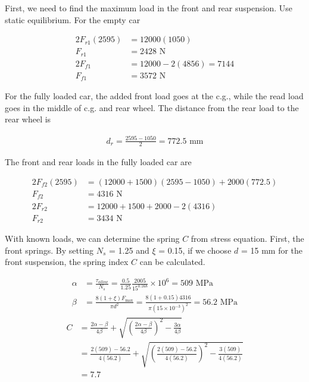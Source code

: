 \documentclass[a4paper,openany,12pt]{book}
\begin{document}
{{First, we need to find the maximum load in the front and rear
suspension. Use static equilibrium. For the empty car

$$\begin{aligned}
     2F_{r1}(2595) &= 12000(1050) \\
     F_{r1} &= 2428 \text{ N} \\
     2F_{f1} &= 12000 - 2(4856) = 7144 \\
     F_{f1} &= 3572 \text{ N}
   \end{aligned}$$

For the fully loaded car, the added front load goes at the c.g., while
the read load goes in the middle of c.g. and rear wheel. The distance
from the rear load to the rear wheel is

$$\begin{gathered}
     d_r = \frac{2595 - 1050}{2} = 772.5 \text{ mm}
   \end{gathered}$$

The front and rear loads in the fully loaded car are

$$\begin{aligned}
     2F_{f2}(2595) &= (12000 + 1500)(2595 - 1050) + 2000(772.5) \\
     F_{f2} &= 4316 \text{ N} \\
     2F_{r2} &= 12000 + 1500 + 2000 - 2(4316) \\
     F_{r2} &= 3434 \text{ N}
   \end{aligned}$$

With known loads, we can determine the spring \(C\) from stress equation.
First, the front springs. By setting \(N_s\) = 1.25 and \(\xi\) = 0.15, if
we choose \(d\) = 15 mm for the front suspension, the spring index \(C\) can
be calculated.

$$\begin{aligned}
    \alpha &= \frac{\tau_{allow}}{N_s} = \frac{0.5}{1.25}\frac{2005}{15^{0.168}} \times 10^6 = 509 \text{ MPa} \\ 
    \beta &= \frac{8(1 + \xi)F_{\max}}{\pi d^2} = \frac{8(1 + 0.15)4316}{\pi (15 \times 10^{-3})^2} = 56.2 \text{ MPa}
  \end{aligned}$$ $$\begin{aligned}
    C &= \frac{2\alpha  - \beta}{4\beta} + \sqrt {\left( \frac{2\alpha  - \beta}{4\beta} \right)^2 - \frac{3\alpha}{4\beta}}  \\ 
      & = \frac{2(509) - 56.2}{4(56.2)} + \sqrt {\left( \frac{2(509) - 56.2}{4(56.2)} \right)^2 - \frac{3(509)}{4(56.2)}}  \\ 
      &= 7.7 
  \end{aligned}$$

}}
\end{document}
